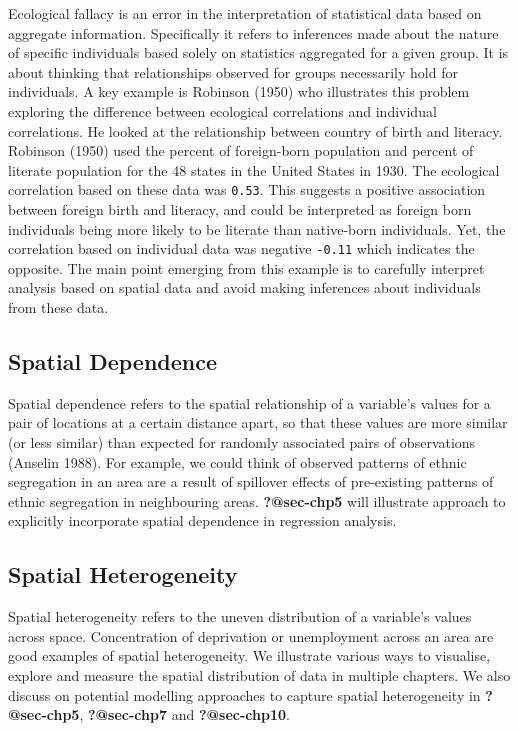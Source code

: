 \documentclass[
  letterpaper,
  krantz2]{style/krantz}
\begin{document}
Ecological fallacy is an error in the interpretation of statistical data
based on aggregate information. Specifically it refers to inferences
made about the nature of specific individuals based solely on statistics
aggregated for a given group. It is about thinking that relationships
observed for groups necessarily hold for individuals. A key example is
Robinson (1950) who illustrates this problem exploring the difference
between ecological correlations and individual correlations. He looked
at the relationship between country of birth and literacy. Robinson
(1950) used the percent of foreign-born population and percent of
literate population for the 48 states in the United States in 1930. The
ecological correlation based on these data was \texttt{0.53}. This
suggests a positive association between foreign birth and literacy, and
could be interpreted as foreign born individuals being more likely to be
literate than native-born individuals. Yet, the correlation based on
individual data was negative \texttt{-0.11} which indicates the
opposite. The main point emerging from this example is to carefully
interpret analysis based on spatial data and avoid making inferences
about individuals from these data.

\hypertarget{spatial-dependence}{%
\subsection{Spatial Dependence}\label{spatial-dependence}}

Spatial dependence refers to the spatial relationship of a variable's
values for a pair of locations at a certain distance apart, so that
these values are more similar (or less similar) than expected for
randomly associated pairs of observations (Anselin 1988). For example,
we could think of observed patterns of ethnic segregation in an area are
a result of spillover effects of pre-existing patterns of ethnic
segregation in neighbouring areas. \textbf{?@sec-chp5} will illustrate
approach to explicitly incorporate spatial dependence in regression
analysis.

\hypertarget{spatial-heterogeneity}{%
\subsection{Spatial Heterogeneity}\label{spatial-heterogeneity}}

Spatial heterogeneity refers to the uneven distribution of a variable's
values across space. Concentration of deprivation or unemployment across
an area are good examples of spatial heterogeneity. We illustrate
various ways to visualise, explore and measure the spatial distribution
of data in multiple chapters. We also discuss on potential modelling
approaches to capture spatial heterogeneity in \textbf{?@sec-chp5},
\textbf{?@sec-chp7} and \textbf{?@sec-chp10}.
\end{document}

